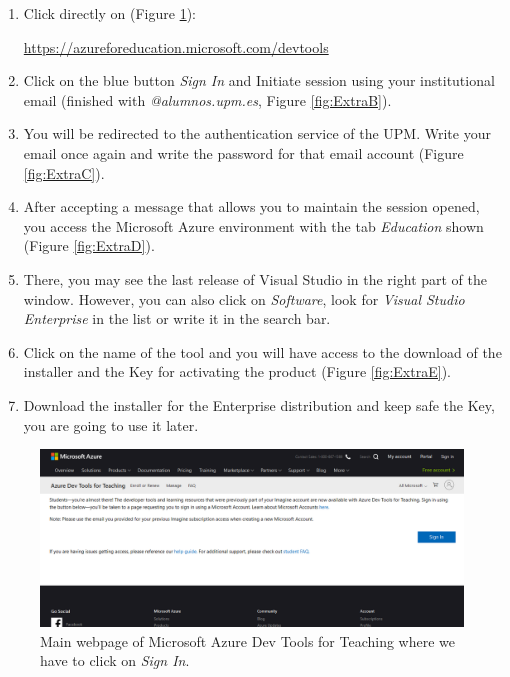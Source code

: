 \begin{enumerate}
    \item Click directly on (Figure \ref{fig:ExtraA}):
    
     \url{https://azureforeducation.microsoft.com/devtools}
    \item Click on the blue button \textit{Sign In} and Initiate session using your institutional email (finished with \textit{@alumnos.upm.es}, Figure \ref{fig:ExtraB}).
    \item You will be redirected to the authentication service of the UPM. Write your email once again and write the password for that email account (Figure \ref{fig:ExtraC}).
    \item After accepting a message that allows you to maintain the session opened, you access the Microsoft Azure environment with the tab \textit{Education} shown (Figure \ref{fig:ExtraD}).
    \item There, you may see the last release of Visual Studio in the right part of the window. However, you can also click on \textit{Software}, look for \textit{Visual Studio Enterprise} in the list or write it in the search bar.
    \item Click on the name of the tool and you will have access to the download of the installer and the Key for activating the product (Figure \ref{fig:ExtraE}). 
    \item Download the installer for the Enterprise distribution and keep safe the Key, you are going to use it later.    
\end{enumerate}

\begin{figure}
    \centering
    \includegraphics[width= \textwidth]{Figures/ExtraA}
    \caption{Main webpage of Microsoft Azure Dev Tools for Teaching where we have to click on \textit{Sign In}.}
    \label{fig:ExtraA}
\end{figure}

